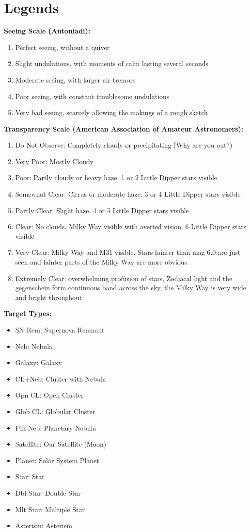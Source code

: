 \section{Legends}

\noindent 

\bigskip 
{\bf Seeing Scale (Antoniadi):}
\begin{enumerate}
\item Perfect seeing, without a quiver
\item Slight undulations, with moments of calm lasting several seconds
\item Moderate seeing, with larger air tremors
\item Poor seeing, with constant troublesome undulations
\item Very bad seeing, scarcely allowing the makings of a rough sketch
\end{enumerate}

\bigskip     
{\bf Transparency Scale (American Association of Amateur Astronomers):}
\begin{enumerate}
\item Do Not Observe: Completely cloudy or precipitating (Why are you out?)
\item Very Poor: Mostly Cloudy
\item Poor: Partly cloudy or heavy haze. 1 or 2 Little Dipper stars visible
\item Somewhat Clear: Cirrus or moderate haze. 3 or 4 Little Dipper stars visible
\item Partly Clear: Slight haze. 4 or 5 Little Dipper stars visible
\item Clear: No clouds. Milky Way visible with averted vision. 6 Little Dipper stars visible
\item Very Clear: Milky Way and M31 visible. Stars fainter than mag 6.0 are just seen and fainter parts of the Milky Way are more obvious 
\item Extremely Clear: overwhelming profusion of stars, Zodiacal light and the gegenschein form continuous band across the sky, the Milky Way is very wide and bright throughout
\end{enumerate}

\bigskip
{\bf Target Types:}
\begin{itemize}
\renewcommand\labelitemi{--}
\item SN Rem: Supernova Remnant
\item Neb: Nebula
\item Galaxy: Galaxy
\item CL+Neb: Cluster with Nebula
\item Opn CL: Open Cluster
\item Glob CL: Globular Cluster
\item Pln Neb: Planetary Nebula
\item Satellite: Our Satellite (Moon)
\item Planet: Solar System Planet
\item Star: Star
\item Dbl Star: Double Star
\item Mlt Star: Multiple Star
\item Asterism: Asterism
\end{itemize}


